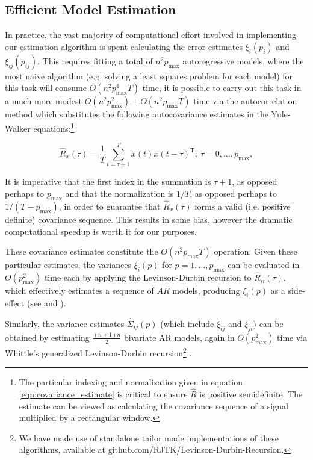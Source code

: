 \documentclass{statsoc}
\def\T{\mathsf{T}}  %
\begin{document}
\subsection{Efficient Model Estimation}
\label{sec:efficient_model_estimation}
In practice, the vast majority of computational effort involved in
implementing our estimation algorithm is spent calculating the error
estimates $\xi_i(p_i)$ and $\xi_{ij}(p_{ij})$.  This requires fitting a
total of $n^2p_{\text{max}}$ autoregressive models, where the most
naive algorithm (e.g. solving a least squares problem for each model)
for this task will consume $O(n^2p_{\text{max}}^4T)$ time, it is
possible to carry out this task in a much more modest
$O(n^2p_{\text{max}}^2 ) + O(n^2p_{\text{max}}T)$ time via the
autocorrelation method
\cite{hayes_statistical_digital_signal_processing} which substitutes
the following autocovariance estimates in the Yule-Walker
equations:\footnote{The particular indexing and normalization given in
  equation \ref{eqn:covariance_estimate} is critical to ensure
  $\widehat{R}$ is positive semidefinite.  The estimate can be viewed
  as calculating the covariance sequence of a signal multiplied by a
  rectangular window.}

\begin{equation}
  \label{eqn:covariance_estimate}
  \widehat{R}_x(\tau) = \frac{1}{T}\sum_{t = \tau + 1}^T x(t) x(t - \tau)^\T;\ \tau = 0, \ldots, p_{\text{max}},
\end{equation}

It is imperative that the first index in the summation is $\tau + 1$, as
opposed perhaps to $p_\text{max}$ and that the normalization is
$1 / T$, as opposed perhaps to $1 / (T - p_\text{max})$, in order to
guarantee that $\widehat{R}_x(\tau)$ forms a valid (i.e. positive
definite) covariance sequence.  This results in some bias, however the
dramatic computational speedup is worth it for our purposes.

These covariance estimates constitute the $O(n^2p_{\text{max}}T)$
operation.  Given these particular estimates, the variances $\xi_i(p)$
for $p = 1, \ldots, p_{\text{max}}$ can be evaluated in
$O(p_{\text{max}}^2)$ time each by applying the Levinson-Durbin
recursion to $\widehat{R}_{ii}(\tau)$, which effectively estimates a
sequence of $AR$ models, producing $\xi_i(p)$ as a side-effect (see
\cite{hayes_statistical_digital_signal_processing} and
\cite{levinson_durbin_recursion}).

Similarly, the variance estimates $\widehat{\Sigma}_{ij}(p)$ (which
include $\xi_{ij}$ and $\xi_{ji}$) can be obtained by estimating
$\frac{(n + 1)n}{2}$ bivariate AR models, again in
$O(p_{\text{max}}^2)$ time via Whittle's generalized Levinson-Durbin
recursion\footnote{We have made use of standalone tailor made
  implementations of these algorithms, available at
  \textsf{github.com/RJTK/Levinson-Durbin-Recursion}.}
\cite{whittle_generalized_levinson_durbin}.
\end{document}
